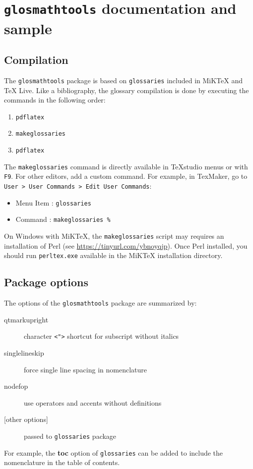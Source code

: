 \documentclass[projet,nohyperref,article,english,french]{ulthese}
\begin{document}
\frontmatter  
\frontispice

\printglossary[title=Nomenclature]

\mainmatter                     

\chapter{\texttt{glosmathtools} documentation and sample}

\section{Compilation}
The \texttt{glosmathtools} package is based on \texttt{glossaries} included in MiKTeX and TeX Live. Like a bibliography, the glossary compilation is done by executing the commands in the following order:
\begin{enumerate}
	\item \texttt{pdflatex}
	\item \texttt{makeglossaries}
	\item \texttt{pdflatex}
\end{enumerate}
The \texttt{makeglossaries} command is directly available in TeXstudio menus or with \texttt{F9}. For other editors, add a custom command. For example, in TexMaker, go to \texttt{User > User Commands > Edit User Commands}:
\begin{itemize}
	\item Menu Item : \texttt{glossaries} 
	\item Command : \texttt{makeglossaries \%}
\end{itemize}
On Windows with MiKTeX, the \texttt{makeglossaries} script may requires an installation of Perl (see \url{https://tinyurl.com/ybnoyqjp}). Once Perl installed, you should run \texttt{perltex.exe} available in the MiKTeX installation directory.

\section{Package options}
The options of the \texttt{glosmathtools} package are summarized by:
\begin{description}
	\item[qtmarkupright] character \texttt{<">} shortcut for subscript without italics
	\item[singlelineskip] force single line spacing in nomenclature
	\item[nodefop] use operators and accents without definitions
	\item[{[other options]}] passed to \texttt{glossaries} package
\end{description}
For example, the \textbf{toc} option of \texttt{glossaries} can be added to include the nomenclature in the table of contents.
\end{document}
